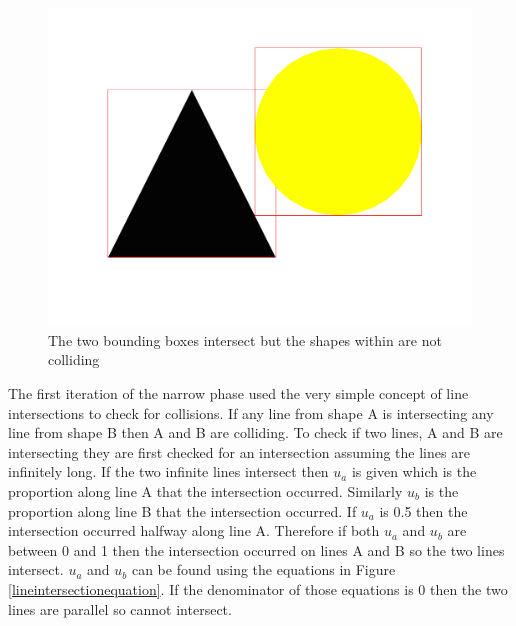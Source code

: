 \documentclass[]{report}
\begin{document}
			\begin{figure}[H]
				\centering
				\includegraphics[scale=0.25]{bbnocollision}
				\caption{The two bounding boxes intersect but the shapes within are not colliding}
				\label{bbnocollision}
			\end{figure}
			
			The first iteration of the narrow phase used the very simple concept of line intersections to check for collisions. If any line from shape A is intersecting any line from shape B then A and B are colliding. To check if two lines, A and B are intersecting they are first checked for an intersection assuming the lines are infinitely long. If the two infinite lines intersect then $u_{a}$ is given which is the proportion along line A that the intersection occurred. Similarly $u_{b}$ is the proportion along line B that the intersection occurred. If $u_{a}$ is 0.5 then the intersection occurred halfway along line A. Therefore if both $u_{a}$ and $u_{b}$ are between 0 and 1 then the intersection occurred on lines A and B so the two lines intersect. $u_{a}$ and $u_{b}$ can be found using the equations in Figure \ref{lineintersectionequation}. If the denominator of those equations is 0 then the two lines are parallel so cannot intersect.
			
\end{document}
